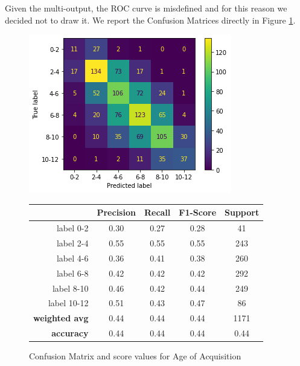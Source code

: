 \documentclass[a4paper,11pt,dvipsnames]{article}
\begin{document}
Given the multi-output, the ROC curve is misdefined and for this reason we decided not to draw it. We report the Confusion Matrices directly in Figure \ref{aoa_multi}.

\begin{figure}[h]
  \begin{minipage}{.4\linewidth}
    \centering
    \includegraphics[width=\textwidth]{aoa_multi_confusion_matrix.png}%
  \end{minipage}
  \begin{minipage}{.2\linewidth}
    \centering

\begin{tabular}{|r|c|c|c|c|}
\toprule
{} &  \textbf{Precision} &    \textbf{Recall} &  \textbf{F1-Score} &      \textbf{Support} \\
\midrule\midrule
label 0-2     &   0.30 &  0.27 &  0.28 &    41 \\
label 2-4     &   0.55 &  0.55 &  0.55 &   243 \\
label 4-6     &   0.36 &  0.41 &  0.38 &   260 \\
label 6-8     &   0.42 &  0.42 &  0.42 &   292 \\
label 8-10    &   0.46 &  0.42 &  0.44 &   249 \\
label 10-12   &   0.51 &  0.43 &  0.47 &    86 \\\hline
\textbf{weighted avg} &   0.44 &  0.44 &  0.44 &  1171 \\
\textbf{accuracy}     &   0.44 &  0.44 &  0.44 &     0.44 \\
\bottomrule
\end{tabular}

  \end{minipage}
  
  \caption{Confusion Matrix and score values for Age of Acquisition} \label{aoa_multi}
\end{figure}
\end{document}
